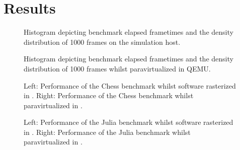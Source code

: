 
\chapter{Results}
\label{cha:results}



\begin{figure}
\begin{center}
	

	\label{fig:results_hosthistograms}
	\caption{Histogram depicting benchmark elapsed frametimes and the density distribution of 1000 frames on the simulation host.}
\end{center}
\end{figure}

\begin{figure}
\begin{center}
	

	\label{fig:results_qemuhistograms}
	\caption{Histogram depicting benchmark elapsed frametimes and the density distribution of 1000 frames whilst paravirtualized in QEMU.}
\end{center}
\end{figure}

\begin{sidewaysfigure}
\begin{center}
	

	\label{simicsparachesshistograms}
	\caption{Left: Performance of the Chess benchmark whilst software rasterized in \dvttermsimics . Right: Performance of the Chess benchmark whilst paravirtualized in \dvttermsimics .}
\end{center}
\end{sidewaysfigure}

\begin{sidewaysfigure}
\begin{center}
	

    \label{fig:results_simicsparajuliahistograms}
    \caption{Left: Performance of the Julia benchmark whilst software rasterized in \dvttermsimics . Right: Performance of the Julia benchmark whilst paravirtualized in \dvttermsimics .}
\end{center}
\end{sidewaysfigure}

